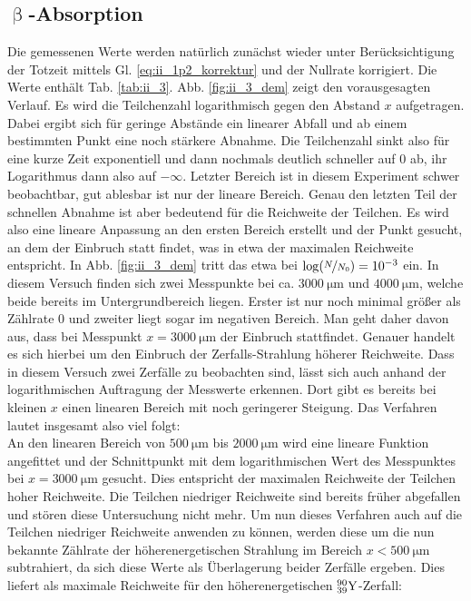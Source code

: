 \subsection{\texorpdfstring{$\upbeta$}{Beta}-Absorption}
Die gemessenen Werte werden natürlich zunächst wieder unter Berücksichtigung der Totzeit mittels Gl. \eqref{eq:ii_1p2_korrektur} und der Nullrate korrigiert. Die Werte enthält Tab. \ref{tab:ii_3}. Abb. \ref{fig:ii_3_dem} zeigt den vorausgesagten Verlauf. Es wird die Teilchenzahl logarithmisch gegen den Abstand $x$ aufgetragen. Dabei ergibt sich für geringe Abstände ein linearer Abfall und ab einem bestimmten Punkt eine noch stärkere Abnahme. Die Teilchenzahl sinkt also für eine kurze Zeit exponentiell und dann nochmals deutlich schneller auf 0 ab, ihr Logarithmus dann also auf $-\infty$. Letzter Bereich ist in diesem Experiment schwer beobachtbar, gut ablesbar ist nur der lineare Bereich. Genau den letzten Teil der schnellen Abnahme ist aber bedeutend für die Reichweite der Teilchen. Es wird also eine lineare Anpassung an den ersten Bereich erstellt und der Punkt gesucht, an dem der Einbruch statt findet, was in etwa der maximalen Reichweite entspricht. In Abb. \ref{fig:ii_3_dem} tritt das etwa bei $\log(\nicefrac{N}{N_0}) = 10^{-3}$ ein. In diesem Versuch finden sich zwei Messpunkte bei ca. $\SI{3000}{\micro\meter}$ und $\SI{4000}{\micro\meter}$, welche beide bereits im Untergrundbereich liegen. Erster ist nur noch minimal größer als Zählrate 0 und zweiter liegt sogar im negativen Bereich. Man geht daher davon aus, dass bei Messpunkt $x=\SI{3000}{\micro\meter}$ der Einbruch stattfindet. Genauer handelt es sich hierbei um den Einbruch der Zerfalls-Strahlung höherer Reichweite. Dass in diesem Versuch zwei Zerfälle zu beobachten sind, lässt sich auch anhand der logarithmischen Auftragung der Messwerte erkennen. Dort gibt es bereits bei kleinen $x$ einen linearen Bereich mit noch geringerer Steigung. Das Verfahren lautet insgesamt also viel folgt:\\
An den linearen Bereich von $\SI{500}{\micro\meter}$ bis $\SI{2000}{\micro\meter}$ wird eine lineare Funktion angefittet und der Schnittpunkt mit dem logarithmischen Wert des Messpunktes bei $x=\SI{3000}{\micro\meter}$ gesucht. Dies entspricht der maximalen Reichweite der Teilchen hoher Reichweite. Die Teilchen niedriger Reichweite sind bereits früher abgefallen und stören diese Untersuchung nicht mehr. Um nun dieses Verfahren auch auf die Teilchen niedriger Reichweite anwenden zu können, werden diese um die nun bekannte Zählrate der höherenergetischen Strahlung im Bereich $x < \SI{500}{\micro\meter}$ subtrahiert, da sich diese Werte als Überlagerung beider Zerfälle ergeben. Dies liefert als maximale Reichweite für den höherenergetischen $\element{Y}{39}{90}$-Zerfall:
